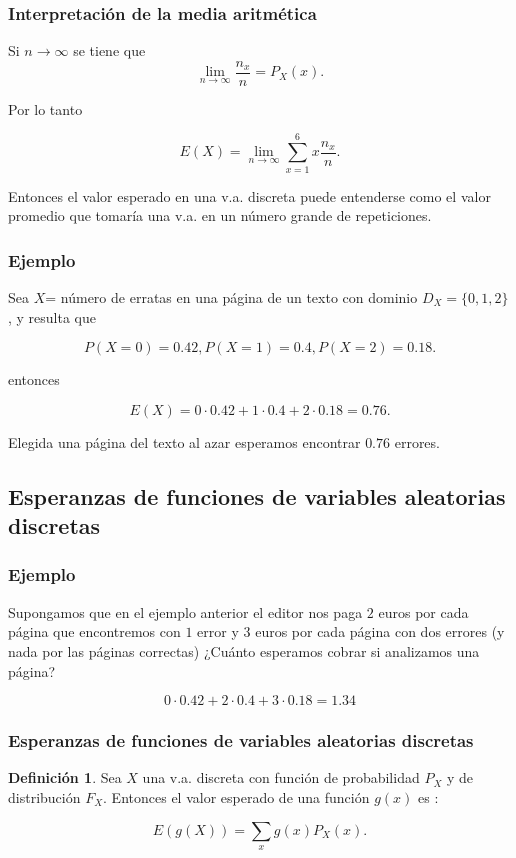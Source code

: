 \documentclass[handout]{beamer}\usepackage[]{graphicx}\usepackage[]{color}
\renewcommand{\emph}[1]{{\color{red}#1}}
\theoremstyle{plain}
\theoremstyle{definition}
\newtheorem{definicion}{Definición}
\begin{document}
\begin{frame}
\frametitle{Interpretación de la media aritmética}

Si $n\to \infty$ se tiene que  
$$\lim_{n\to \infty} \frac{n_{x}}{n}=P_{X}(x).$$

Por lo tanto

$$E(X)=\displaystyle \lim_{n\to\infty}\sum_{x=1}^{6}x \frac{n_{x}}{n}.$$

Entonces el valor esperado en una v.a. discreta puede entenderse como el valor promedio que
tomaría una v.a. en un número grande de repeticiones.
\end{frame}


\begin{frame}

\frametitle{Ejemplo}
    Sea $X$= número  de erratas en una página de un texto con dominio $D_X=\{0,1,2\}$, y resulta que

    $$P(X=0)=0.42, P(X=1)=0.4, P(X=2)=0.18.$$
    
    entonces
    
    $$E(X)=0\cdot 0.42+ 1\cdot 0.4 + 2 \cdot 0.18=0.76.$$

    Elegida una página del texto al azar esperamos encontrar $0.76$
    errores.

\end{frame}


\subsection{Esperanzas de funciones de variables aleatorias discretas}

\begin{frame}
\frametitle{Ejemplo}
Supongamos que en el ejemplo anterior el editor nos paga $2$ euros por cada página que
encontremos con $1$ error y $3$ euros por cada página con  dos errores (y nada por las
páginas correctas) ¿Cuánto esperamos cobrar si analizamos una página?

$$0\cdot 0.42 + 2\cdot 0.4 + 3\cdot 0.18=1.34$$
\end{frame}

\begin{frame}
\frametitle{Esperanzas de funciones de variables aleatorias discretas}
\begin{definicion}
Sea $X$ una v.a. discreta con función de probabilidad $P_{X}$ y de distribución
$F_{X}$. Entonces el \emph{valor esperado de una función} $g(x)$ es :

$$E(g(X))=\sum_{x}g(x) P_{X}(x).$$
\end{definicion}
\end{frame}
\end{document}
